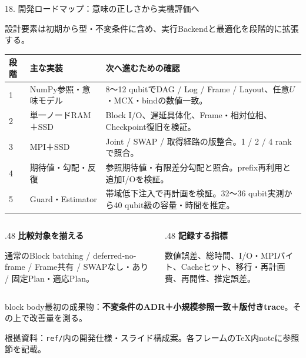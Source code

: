 \documentclass[aspectratio=169,10pt,hyperref={unicode,hidelinks}]{beamer}
\newcommand{\takeaway}[1]{\par\vspace{2mm}\begin{beamercolorbox}[wd=\textwidth,sep=1.5mm]{block body}\small #1\end{beamercolorbox}\par}
\newcommand{\smallnote}[1]{\par{\footnotesize\color{muted}#1\par}}
\begin{document}
\begin{frame}{18. 開発ロードマップ：意味の正しさから実機評価へ}
  \smallnote{設計要素は初期から型・不変条件に含め、実行Backendと最適化を段階的に拡張する。}
  \footnotesize
  \begin{tabularx}{\textwidth}{@{}p{}p{}X@{}}
    \toprule 段階 & 主な実装 & 次へ進むための確認 \\
    \midrule
    1 & NumPy参照・意味モデル & 8〜12 qubitでDAG / Log / Frame / Layout、任意$U$・MCX・bindの数値一致。\\
    2 & 単一ノードRAM＋SSD & Block I/O、遅延具体化、Frame・相対位相、Checkpoint復旧を検証。\\
    3 & MPI＋SSD & Joint / SWAP / 取得経路の版整合。1 / 2 / 4 rankで照合。\\
    4 & 期待値・勾配・反復 & 参照期待値・有限差分勾配と照合。prefix再利用と追加I/Oを検証。\\
    5 & Guard・Estimator & 帯域低下注入で再計画を検証。32〜36 qubit実測から40 qubit級の容量・時間を推定。\\
    \bottomrule
  \end{tabularx}
  \medskip
  \begin{columns}[T,onlytextwidth]
    \begin{column}{.48\textwidth}
      \textbf{比較対象を揃える}\par
      通常のBlock batching / deferred-no-frame / Frame共有 / SWAPなし・あり / 固定Plan・適応Plan。
    \end{column}
    \begin{column}{.48\textwidth}
      \textbf{記録する指標}\par
      数値誤差、総時間、I/O・MPIバイト、Cacheヒット、移行・再計画費、再開性、推定誤差。
    \end{column}
  \end{columns}
  \takeaway{最初の成果物：\textbf{不変条件のADR＋小規模参照一致＋版付きtrace}。その上で改善量を測る。}
  \smallnote{根拠資料：\texttt{ref/}内の開発仕様・スライド構成案。各フレームのTeX内noteに参照節を記載。}
\end{frame}
\end{document}
